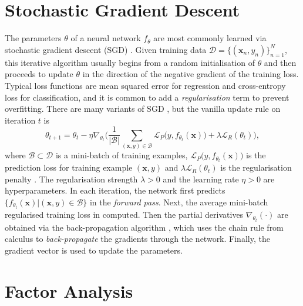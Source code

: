 \documentclass[msc,deptreport.inf]{infthesis} %
\newcommand{\matr}[1]{\mathbf{#1}}
\begin{document}
\section{Stochastic Gradient Descent}

The parameters $\theta$ of a neural network $f_\theta$ are most commonly learned via stochastic gradient descent (SGD) \cite{goodfellow2016}. Given training data $\mathcal{D} = \{(\matr{x}_n, y_n)\}_{n=1}^{N}$, this iterative algorithm usually begins from a random initialisation of $\theta$ and then proceeds to update $\theta$ in the direction of the negative gradient of the training loss. Typical loss functions are mean squared error for regression and cross-entropy loss for classification, and it is common to add a \emph{regularisation} term to prevent overfitting. There are many variants of SGD \cite{ruder2016}, but the vanilla update rule on iteration $t$ is 
\begin{equation}\label{eqn:sgd}
	\theta_{t+1} = \theta_t - \eta \nabla_{\theta_t} \Bigg( \frac{1}{|\mathcal{B}|} \sum_{(\matr{x}, y) \in \mathcal{B}} \mathcal{L}_P \big(y, f_{\theta_t}(\matr{x})\big) + \lambda \mathcal{L}_R (\theta_t) \Bigg),
\end{equation}
where $\mathcal{B} \subset \mathcal{D}$ is a mini-batch of training examples, $\mathcal{L}_P \big(y, f_{\theta_t}(\matr{x})\big)$ is the prediction loss for training example $(\matr{x}, y)$ and $\lambda \mathcal{L}_R (\theta_t)$ is the regularisation penalty \cite{brownlie2021}. The regularisation strength $\lambda > 0$ and the learning rate $\eta > 0$ are hyperparameters. In each iteration, the network first predicts  $\{f_{\theta_t}(\matr{x})| (\matr{x}, y) \in \mathcal{B}\}$ in the \emph{forward pass}. Next, the average mini-batch regularised training loss in computed. Then the partial derivatives $\nabla_{\theta_t}(\cdot)$ are obtained via the back-propagation algorithm \cite{rumelhart1986}, which uses the chain rule from calculus to \emph{back-propagate} the gradients through the network. Finally, the gradient vector is used to update the parameters. 


\section{Factor Analysis}\label{sec:fa}
\end{document}
